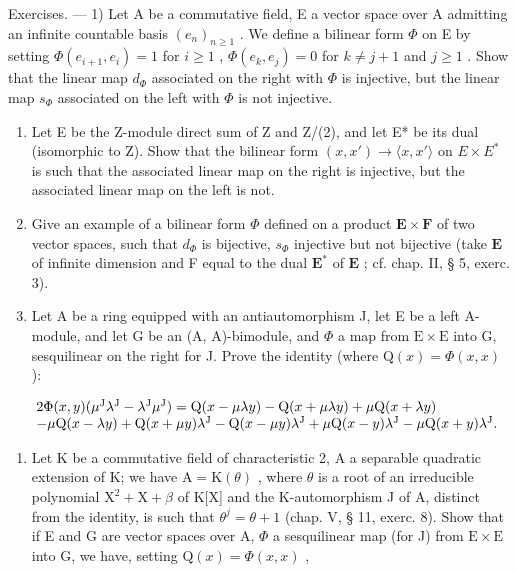 Exercises. --- 1) Let A be a commutative field, E a vector space over A admitting an infinite countable basis \((e_n)_{n \geqslant 1}\) . We define a bilinear form \(\Phi\) on E by setting \(\Phi(e_{i+1}, e_i) = 1\) for \(i \geqslant 1\) , \(\Phi(e_k, e_j) = 0\) for \(k \neq j + 1\) and \(j \geqslant 1\) . Show that the linear map \(d_\Phi\) associated on the right with \(\Phi\) is injective, but the linear map \(s_\Phi\) associated on the left with \(\Phi\) is not injective.

\begin{enumerate}
\def\labelenumi{\arabic{enumi})}
\setcounter{enumi}{1}
\item
  Let E be the Z-module direct sum of Z and Z/(2), and let E* be its dual (isomorphic to Z). Show that the bilinear form \((x, x') \to \langle x, x' \rangle\) on \(E \times E^*\) is such that the associated linear map on the right is injective, but the associated linear map on the left is not.
\item
  Give an example of a bilinear form \(\Phi\) defined on a product \(\mathbf{E} \times \mathbf{F}\) of two vector spaces, such that \(d_{\Phi}\) is bijective, \(s_{\Phi}\) injective but not bijective (take \(\mathbf{E}\) of infinite dimension and F equal to the dual \(\mathbf{E}^*\) of \(\mathbf{E}\) ; cf. chap. II, § 5, exerc. 3).
\item
  Let A be a ring equipped with an antiautomorphism J, let E be a left A-module, and let G be an (A, A)-bimodule, and \(\Phi\) a map from \(\mathrm{E} \times \mathrm{E}\) into G, sesquilinear on the right for J. Prove the identity (where \(\mathrm{Q}(x) = \Phi(x, x)\) ):
\end{enumerate}

\[
\begin{array}{r l} & {2 \Phi (x, y) (\mu^ {\mathrm{J}} \lambda^ {\mathrm{J}} - \lambda^ {\mathrm{J}} \mu^ {\mathrm{J}}) = \mathrm{Q} (x - \mu \lambda y) - \mathrm{Q} (x + \mu \lambda y) + \mu \mathrm{Q} (x + \lambda y)} \\ & {- \mu \mathrm{Q} (x - \lambda y) + \mathrm{Q} (x + \mu y) \lambda^ {\mathrm{J}} - \mathrm{Q} (x - \mu y) \lambda^ {\mathrm{J}} + \mu \mathrm{Q} (x - y) \lambda^ {\mathrm{J}} - \mu \mathrm{Q} (x + y) \lambda^ {\mathrm{J}}.} \end{array}
\]

\begin{enumerate}
\def\labelenumi{\arabic{enumi})}
\setcounter{enumi}{4}
\tightlist
\item
  Let K be a commutative field of characteristic 2, A a separable quadratic extension of K; we have \(\mathrm{A} = \mathrm{K}(\theta)\) , where \(\theta\) is a root of an irreducible polynomial \(\mathrm{X}^2 +\mathrm{X} + \beta\) of K{[}X{]} and the K-automorphism J of A, distinct from the identity, is such that \(\theta^{j} = \theta +1\) (chap. V, § 11, exerc. 8). Show that if E and G are vector spaces over A, \(\Phi\) a sesquilinear map (for J) from \(\mathrm{E}\times \mathrm{E}\) into G, we have, setting \(\mathrm{Q}(x) = \Phi (x,x)\) ,
\end{enumerate}

